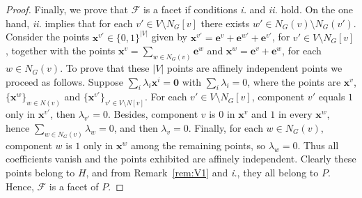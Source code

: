 \documentclass[10pt,a4paper]{amsart}
\begin{document}
\begin{proof}
    Finally, we prove that $\mathcal{F}$ is a facet if conditions \textit{i.} and \textit{ii.} hold. 
    On the one hand, \textit{ii.} implies that for each $v'\in V\setminus N_G[v]$ there exists  $w'\in N_G(v)\setminus N_G(v')$. Consider the points $\mathbf{x}^{v'}\in\{0,1\}^{|V|}$ given by $\mathbf{x}^{v'}=\mathbf{e}^v+\mathbf{e}^{w'}+\mathbf{e}^{v'}$, for $v'\in V\setminus N_G[v]$, together with the points $\mathbf{x}^v=\sum_{w\in N_G(v)}\mathbf{e}^w$ and $\mathbf{x}^{w}=\mathbf{e}^v+\mathbf{e}^w$, for each $w\in N_G(v)$. To prove  that these $|V|$ points are affinely independent points we proceed as follows. Suppose $\sum_i\lambda_i \mathbf{x}^{i}= \mathbf{0}$ with
$\sum_i\lambda_i=0$, where the points are $\mathbf{x}^{v}$, $\{\mathbf{x}^{w}\}_{w\in N(v)}$ and
$\{\mathbf{x}^{v'}\}_{v'\in V\setminus N[v]}$. For each $v'\in V\setminus N_G[v]$, component
$v'$ equals $1$ only in $\mathbf{x}^{v'}$, then $\lambda_{v'}=0$. Besides, component $v$ is $0$ in
$\mathbf{x}^{v}$ and $1$ in every $\mathbf{x}^{w}$, hence $\sum_{w\in N_G(v)}\lambda_{w}=0$, and then
$\lambda_v=0$. Finally, for each $w\in N_G(v)$, component $w$ is $1$ only in
$\mathbf{x}^{w}$ among the remaining points, so $\lambda_w=0$. Thus all coefficients
vanish and the points exhibited are affinely independent. Clearly these points belong to $H$, and from Remark~\ref{rem:V1} and \textit{i.}, they all belong to $P$. Hence, $\mathcal{F}$ is a facet of $P$.

\end{proof}
\end{document}
